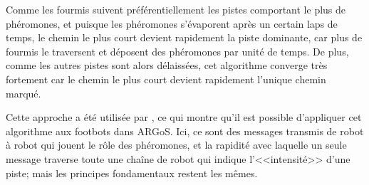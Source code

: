 Comme les fourmis suivent préférentiellement les pistes comportant le plus de phéromones, et puisque les phéromones s'évaporent après un certain laps de temps, le chemin le plus court devient rapidement la piste dominante, car plus de fourmis le traversent et déposent des phéromones par unité de temps. De plus, comme les autres pistes sont alors délaissées, cet algorithme converge très fortement car le chemin le plus court devient rapidement l'unique chemin marqué.~\cite{antOpti}

Cette approche a été utilisée par \cite{pheromonesForaging}, ce qui montre qu'il est possible d'appliquer cet algorithme aux footbots dans ARGoS. Ici, ce sont des messages transmis de robot à robot qui jouent le rôle des phéromones, et la rapidité avec laquelle un seule message traverse toute une chaîne de robot qui indique l'<<intensité>> d'une piste; mais les principes fondamentaux restent les mêmes.
